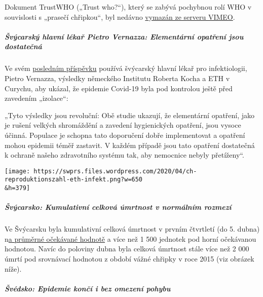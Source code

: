  Dokument TrustWHO („Trust who?``), který se zabývá pochybnou rolí WHO v
souvislosti s „prasečí chřipkou``, byl nedávno
\href{https://www.youtube.com/watch?v=VjQGyqVN5RM}{vymazán ze serveru
VIMEO}.

\hypertarget{ux161vuxfdcarskuxfd-hlavnuxed-luxe9kaux159-pietro-vernazza-elementuxe1rnuxed-opatux159enuxed-jsou-dostateux10dnuxe1}{%
\subparagraph{\texorpdfstring{\textbf{Švýcarský hlavní lékař Pietro
Vernazza: Elementární opatření jsou
dostatečná}}{Švýcarský hlavní lékař Pietro Vernazza: Elementární opatření jsou dostatečná}}\label{ux161vuxfdcarskuxfd-hlavnuxed-luxe9kaux159-pietro-vernazza-elementuxe1rnuxed-opatux159enuxed-jsou-dostateux10dnuxe1}}

Ve svém
\href{https://infekt.ch/2020/04/sind-wir-tatsaechlich-im-blindflug/}{posledním
příspěvku} používá švýcarský hlavní lékař pro infektiologii, Pietro
Vernazza, výsledky německého Institutu Roberta Kocha a ETH v Curychu,
aby ukázal, že epidemie Covid-19 byla pod kontrolou ještě před zavedením
„izolace``:

 „Tyto výsledky jsou revoluční: Obě studie ukazují, že elementární
opatření, jako je rušení velkých shromáždění a zavedení hygienických
opatření, jsou vysoce účinná. Populace je schopna tato doporučení dobře
implementovat a opatření mohou epidemii téměř zastavit. V každém případě
jsou tato opatření dostatečná k ochraně našeho zdravotního systému tak,
aby nemocnice nebyly přetíženy``.

\texttt{[image: https://swprs.files.wordpress.com/2020/04/ch-reproduktionszahl-eth-infekt.png?w=650\\\&h=379]}

\hypertarget{ux161vuxfdcarsko-kumulativnuxed-celkovuxe1-uxfamrtnost-v-normuxe1lnuxedm-rozmezuxed}{%
\subparagraph{\texorpdfstring{\textbf{Švýcarsko: Kumulativní celková
úmrtnost v normálním
rozmezí}}{Švýcarsko: Kumulativní celková úmrtnost v normálním rozmezí}}\label{ux161vuxfdcarsko-kumulativnuxed-celkovuxe1-uxfamrtnost-v-normuxe1lnuxedm-rozmezuxed}}

Ve Švýcarsku byla kumulativní celková úmrtnost v prvním čtvrtletí (do 5.
dubna)
n\href{https://swprs.files.wordpress.com/2020/04/ch-sterblichkeit-kumuliert-q1-2020.pdf}{a
průměrné očekávané hodnotě} a více než 1 500 jednotek pod horní
očekávanou hodnotou. Navíc do poloviny dubna byla celková úmrtnost stále
více než 2 000 úmrtí pod srovnávací hodnotou z období vážné chřipky v
roce 2015 (viz obrázek níže).

\hypertarget{ux161vuxe9dsko-epidemie-konux10duxed-i-bez-omezenuxed-pohybu}{%
\subparagraph{\texorpdfstring{\textbf{Švédsko: Epidemie končí i bez
omezení
pohybu}}{Švédsko: Epidemie končí i bez omezení pohybu}}\label{ux161vuxe9dsko-epidemie-konux10duxed-i-bez-omezenuxed-pohybu}}

